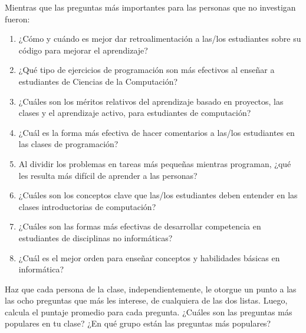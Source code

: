 \noindent
Mientras que las preguntas más importantes para las personas que no investigan fueron:

\begin{enumerate}

\item
  ¿Cómo y cuándo es mejor dar retroalimentación a las/los estudiantes sobre su código para mejorar el aprendizaje?

\item
  ¿Qué tipo de ejercicios de programación son más efectivos al enseñar a estudiantes de Ciencias de la Computación?

\item
  ¿Cuáles son los méritos relativos del aprendizaje basado en proyectos, las clases y el aprendizaje activo, para estudiantes de computación?

\item
  ¿Cuál es la forma más efectiva de hacer comentarios a las/los estudiantes en las clases de programación?

\item
  Al dividir los problemas en tareas más pequeñas mientras programan, ¿qué les resulta más difícil de aprender a las personas?

\item
  ¿Cuáles son los conceptos clave que las/los estudiantes deben entender en las clases introductorias de computación?

\item
  ¿Cuáles son las formas más efectivas de desarrollar competencia en estudiantes de disciplinas no informáticas?

\item
  ¿Cuál es el mejor orden para enseñar conceptos y habilidades básicas en informática?

\end{enumerate}

Haz que cada persona de la clase, independientemente, le otorgue un punto a las
las ocho preguntas que más les interese, de cualquiera de las dos listas.
Luego, calcula el puntaje promedio para cada pregunta.
¿Cuáles son las preguntas más populares en tu clase?
¿En qué grupo  están las preguntas más populares?
